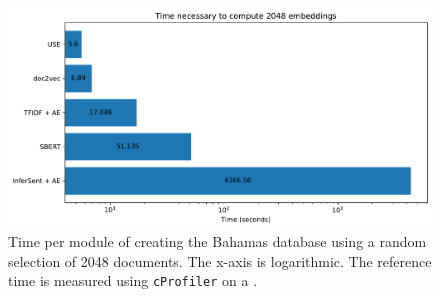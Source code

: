 \begin{figure}[!htp] %
    \centering
    \includegraphics[width=1\textwidth]{images/Elasticsearch/Time_necessary_to_compute_2048_embeddings_log.pdf}
    \caption[Times for creating the database]{Time per module of creating the Bahamas database using a random selection of 2048 documents.
    The x-axis is logarithmic.
    The reference time is measured using \texttt{cProfiler} on a \localMaschineStats{}.
    }
    \label{fig:time_init_db}
\end{figure}